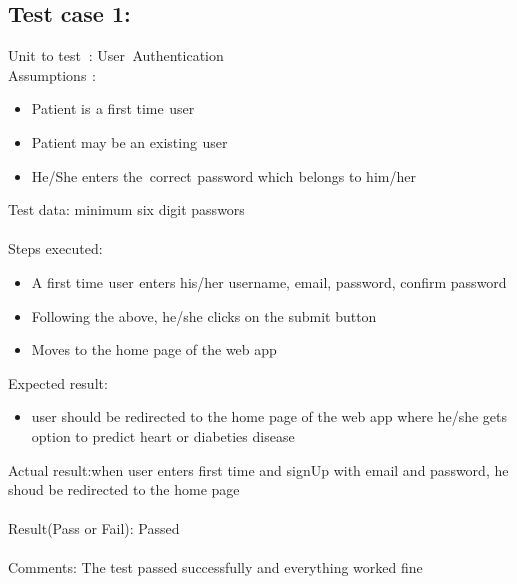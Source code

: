 \documentclass[oneside,12pt]{Classes/VTU}
\begin{document}
	\subsection{Test case 1:}
	Unit\tiny\textcolor{white}{s}\normalsize to test\tiny\textcolor{white}{d}\normalsize : User\tiny\textcolor{white}{y}\normalsize Authentication\tiny\textcolor{white}{s}\normalsize \\
	Assumptions\tiny\textcolor{white}{s}\normalsize :\\
	\begin{itemize}
		\item Patient is\tiny\textcolor{white}{s}\normalsize a first time\tiny\textcolor{white}{s}\normalsize user
		\item Patient may be an existing\tiny\textcolor{white}{s}\normalsize user
		\item He/She enters the\tiny\textcolor{white}{y}\normalsize correct\tiny\textcolor{white}{s}\normalsize password which\tiny\textcolor{white}{s}\normalsize belongs to him/her
	\end{itemize}
	Test data: minimum six digit passwors\\
	\\
	Steps executed:
	\begin{itemize}
		\item A first time\tiny\textcolor{white}{s}\normalsize user\tiny\textcolor{white}{s}\normalsize enters his/her username, email, password, confirm password
		\item Following the above, he/she clicks on the submit button
		\item Moves to the home page of the web app
	\end{itemize}
	Expected result:
	\begin{itemize}
		\item user should be redirected to the home page of the web app where he/she gets option to predict heart or diabeties disease
	\end{itemize}
	Actual result:when user enters first time and signUp with email and password, he shoud be redirected to the home page\\
	\\
	Result(Pass or Fail): Passed\\
	\\
	Comments: The test passed successfully and everything worked fine
	
\end{document}
